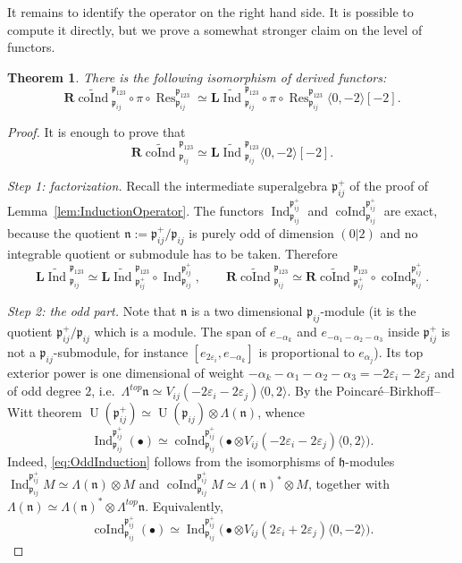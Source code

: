 \documentclass[10pt]{amsart}
\newcommand{\sh}[2]{\langle #1,#2\rangle}
\newtheorem{theoremA}{Theorem}
\newcommand{\fp}{{\mathfrak p}}
\newcommand{\fh}{{\mathfrak h}}
\newcommand{\fn}{{\mathfrak n}}
\newcommand{\Lind}{\mathbf{L}\widetilde{\Ind}}
\newcommand{\Rcoind}{\mathbf{R}\widetilde{\coInd}}
\DeclareMathOperator{\Res}{Res}
\DeclareMathOperator{\Ind}{Ind}
\DeclareMathOperator{\coInd}{coInd}
\DeclareMathOperator{\U}{U}
\begin{document}
	It remains to identify the operator on the right hand side. It is possible to compute it directly, but we prove a somewhat stronger claim on the level of functors.
	\begin{theoremA}\label{thm:IsomorphismInductionCoinduction}
		There is the following isomorphism of derived functors:
		\[{\Rcoind}_{\fp_{ij}}^{\fp_{123}}\circ \pi \circ \Res_{\fp_{ij}}^{\fp_{123}}\simeq {\Lind}_{\fp_{ij}}^{\fp_{123}}\circ \pi \circ 	\Res_{\fp_{ij}}^{\fp_{123}}\sh{0}{-2}[-2].\]
	\end{theoremA}
	
	\begin{proof}
		It is enough to prove that 
		\begin{equation}\label{eq:IndCoindComparison}
			{\Rcoind}_{\fp_{ij}}^{\fp_{123}}\simeq {\Lind}_{\fp_{ij}}^{\fp_{123}}\sh{0}{-2}[-2].
		\end{equation}
		
		{\it Step 1: factorization.} Recall the intermediate superalgebra $\fp_{ij}^+$ of the proof of Lemma~\ref{lem:InductionOperator}. The functors ${\Ind}_{\fp_{ij}}^{\fp_{ij}^+}$ and ${\coInd}_{\fp_{ij}}^{\fp_{ij}^+}$ are exact, because the quotient $\fn:=\fp_{ij}^+/\fp_{ij}$ is purely odd of dimension $(0|2)$ and no integrable quotient or submodule has to be taken. Therefore
		\begin{equation}\label{eq:FactorizationOfBoth}
			{\Lind}_{\fp_{ij}}^{\fp_{123}}\simeq {\Lind}_{\fp_{ij}^+}^{\fp_{123}}\circ {\Ind}_{\fp_{ij}}^{\fp_{ij}^+},\qquad {\Rcoind}_{\fp_{ij}}^{\fp_{123}} \simeq {\Rcoind}_{\fp_{ij}^+}^{\fp_{123}}\circ {\coInd}_{\fp_{ij}}^{\fp_{ij}^+}.
		\end{equation}
		
		{\it Step 2: the odd part.} Note that $\fn$ is a two dimensional $\fp_{ij}$-module (it is the quotient $\fp_{ij}^+/\fp_{ij}$ which is a module. The span of $e_{-\alpha_k}$ and $e_{-\alpha_1-\alpha_2-\alpha_3}$ inside $\fp_{ij}^+$ is not a $\fp_{ij}$-submodule, for instance $[e_{2\varepsilon_i},e_{-\alpha_k}]$ is proportional to $e_{\alpha_j}$). Its top exterior power is one dimensional of weight $-\alpha_k-\alpha_1-\alpha_2-\alpha_3=-2\varepsilon_i-2\varepsilon_j$ and of odd degree $2$, i.e.\ $\Lambda^{top}\fn \simeq V_{ij}(-2\varepsilon_i-2\varepsilon_j)\sh{0}{2}$. By the Poincar\'e--Birkhoff--Witt theorem $\U(\fp_{ij}^+)\simeq \U(\fp_{ij})\otimes \Lambda(\fn)$, whence
		\begin{equation} \label{eq:OddInduction}
			{\Ind}_{\fp_{ij}}^{\fp_{ij}^+}(\bullet)\simeq {\coInd}_{\fp_{ij}}^{\fp_{ij}^+}\bigl(\bullet \otimes V_{ij}(-2\varepsilon_i-2\varepsilon_j)\sh{0}{2}\bigr).
		\end{equation}
		Indeed, \eqref{eq:OddInduction} follows from the isomorphisms of $\fh$-modules ${\Ind}_{\fp_{ij}}^{\fp_{ij}^+}M \simeq \Lambda(\fn)\otimes M$ and ${\coInd}_{\fp_{ij}}^{\fp_{ij}^+}M \simeq \Lambda(\fn)^*\otimes M$, together with $\Lambda(\fn)\simeq \Lambda(\fn)^*\otimes \Lambda^{top}\fn$. Equivalently,
		\begin{equation}\label{eq:OddCoinduction}
			{\coInd}_{\fp_{ij}}^{\fp_{ij}^+}(\bullet)\simeq {\Ind}_{\fp_{ij}}^{\fp_{ij}^+}\bigl(\bullet \otimes V_{ij}(2\varepsilon_i+2\varepsilon_j)\sh{0}{-2}\bigr).
		\end{equation}
		

\end{proof}
\end{document}
